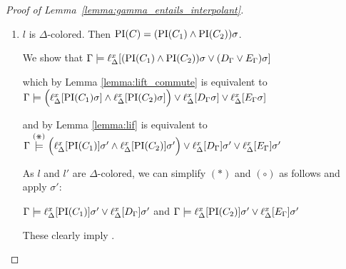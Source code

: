 \begin{proof}[Proof of Lemma~\ref{lemma:gamma_entails_interpolant}]
\begin{description}
\begin{enumerate}
					Since $\sigma = \mgu(l, l')$, $l\sigma$ and $l'\sigma$ are syntactically equal and so $\lifdelta{l\sigma} = \lifdelta{l'\sigma}$.
					
					As by Lemma \ref{lemma:lif} $\lifdelta{l\sigma} = \lifdelta{l}\sigma'$ and $\lifdelta{l'\sigma} = \lifdelta{l'}\sigma'$,
					we get $\lifdelta{l}\sigma' = \lifdelta{l'}\sigma'$.\label{aou5jklah}

					So by applying $\sigma'$ to $(*)$ and $(\circ)$ (note that $l_\Gamma = l$ and $l'_\Gamma = l'$ as they are $\Gamma$-colored), we can perform a resolution step on $\lifdelta{l}\sigma'$ and get

					$\Gamma \entails \lifdelta{\PI(C_1)}\sigma' \lor \lifdelta{D_\Gamma} \sigma' \lor \lifdelta{\PI(C_2)}\sigma' \lor \lifdelta{E_\Gamma} \sigma'$.

					and consequently
				$\Gamma \entails \lifdelta{ \PI(C_1) \lor \PI(C_2) \lor D_\Gamma \lor E_\Gamma}\sigma' $.

				So by Lemma \ref{lemma:lif},

				$\Gamma \entails \lifdelta{ \Big(\PI(C_1) \lor \PI(C_2) \lor D_\Gamma \lor E_\Gamma \Big) \sigma } $.


				\item $l$ is $\Delta$-colored.
					Then $\operatorname{PI}(C) = (\operatorname{PI}(C_1) \land \operatorname{PI}(C_2))\sigma$. 

					We show that $\Gamma \models \ell_{\Delta}^{x}[(\operatorname{PI}(C_1) \land \operatorname{PI}(C_2))\sigma \lor (D_\Gamma \lor E_\Gamma)\sigma]$

					which by Lemma \ref{lemma:lift_commute} is equivalent to\newline
					$\Gamma \models \Big(\ell_{\Delta}^{x}[\operatorname{PI}(C_1)\sigma] \land \ell_{\Delta}^{x}[\operatorname{PI}(C_2)\sigma]\Big) \lor \ell_{\Delta}^{x}[D_\Gamma\sigma] \lor \ell_{\Delta}^{x}[E_\Gamma\sigma]$

					and by Lemma \ref{lemma:lif} is equivalent to\newline
					$\Gamma \stackrel{(\divideontimes)}{\models} \Big(\ell_{\Delta}^{x}[\operatorname{PI}(C_1)]\sigma' \land \ell_{\Delta}^{x}[\operatorname{PI}(C_2)]\sigma'\Big) \lor \ell_{\Delta}^{x}[D_\Gamma]\sigma' \lor \ell_{\Delta}^{x}[E_\Gamma]\sigma'$

					As $l$ and $l'$ are $\Delta$-colored, we can simplify $(*)$ and $(\circ)$ as follows and apply $\sigma'$:

					$\Gamma \models \ell_{\Delta}^{x}[\operatorname{PI}(C_1)]\sigma' \lor \ell_{\Delta}^{x}[D_\Gamma]\sigma' $ and $\Gamma \models \ell_{\Delta}^{x}[\operatorname{PI}(C_2)]\sigma' \lor \ell_{\Delta}^{x}[E_\Gamma]\sigma'$

					These clearly imply \markC.


\end{enumerate}
\end{description}
\end{proof}
